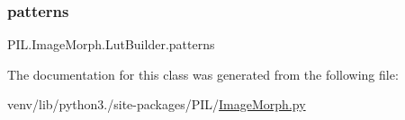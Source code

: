 \mbox{\label{classPIL_1_1ImageMorph_1_1LutBuilder_ab697ff5a1f2743a25ed4b3c1543eecd6}} 
\subsubsection{\texorpdfstring{patterns}{patterns}}
{\footnotesize\ttfamily P\+I\+L.\+Image\+Morph.\+Lut\+Builder.\+patterns}



The documentation for this class was generated from the following file\+:\begin{DoxyCompactItemize}
\item 
venv/lib/python3./site-\/packages/\+P\+I\+L/\hyperlink{ImageMorph_8py}{Image\+Morph.\+py}\end{DoxyCompactItemize}
